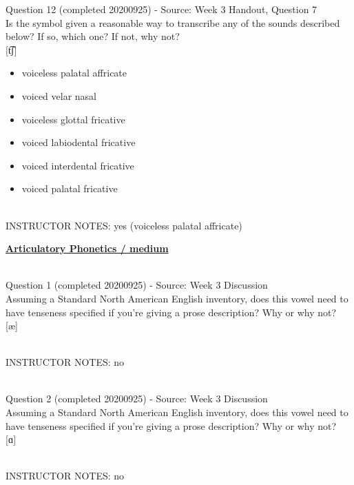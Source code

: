 \documentclass[12pt]{article}
\begin{document}
{\large Question 12} (completed 20200925) - Source: Week 3 Handout, Question 7\\

Is the symbol given a reasonable way to transcribe any of the sounds described below? If so, which one? If not, why not?\\

{[t͡ʃ]}

\begin{itemize} \item voiceless palatal affricate \item voiced velar nasal \item voiceless glottal fricative \item voiced labiodental fricative \item voiced interdental fricative \item voiced palatal fricative \end{itemize}


~\\
INSTRUCTOR NOTES: yes (voiceless palatal affricate)


\newpage\textbf{\underline{\huge Articulatory Phonetics / medium\\}}

~\\

{\large Question 1} (completed 20200925) - Source: Week 3 Discussion\\

Assuming a Standard North American English inventory, does this vowel need to have tenseness specified if you're giving a prose description? Why or why not?\\

{[æ]}


~\\
INSTRUCTOR NOTES: no


~\\

{\large Question 2} (completed 20200925) - Source: Week 3 Discussion\\

Assuming a Standard North American English inventory, does this vowel need to have tenseness specified if you're giving a prose description? Why or why not?\\

{[ɑ]}


~\\
INSTRUCTOR NOTES: no


~\\
\end{document}
